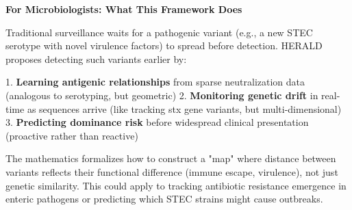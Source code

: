 \documentclass[11pt]{article}
\begin{document}
\begin{mdframed}[backgroundcolor=blue!5]
\textbf{For Microbiologists: What This Framework Does}

Traditional surveillance waits for a pathogenic variant (e.g., a new STEC serotype with novel virulence factors) to spread before detection. HERALD proposes detecting such variants earlier by:

1. \textbf{Learning antigenic relationships} from sparse neutralization data (analogous to serotyping, but geometric)
2. \textbf{Monitoring genetic drift} in real-time as sequences arrive (like tracking stx gene variants, but multi-dimensional)
3. \textbf{Predicting dominance risk} before widespread clinical presentation (proactive rather than reactive)

The mathematics formalizes how to construct a "map" where distance between variants reflects their functional difference (immune escape, virulence), not just genetic similarity. This could apply to tracking antibiotic resistance emergence in enteric pathogens or predicting which STEC strains might cause outbreaks.
\end{mdframed}

\end{document}
